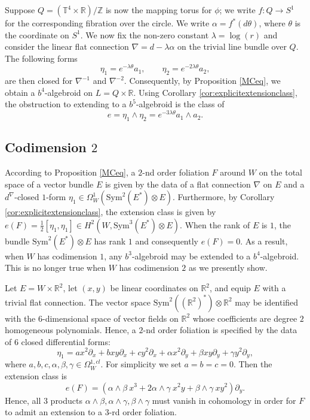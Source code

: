 \documentclass[10pt]{amsart}
\newcommand{\RR}{\mathbb{R}}
\newcommand{\TT}{\mathbb{T}}
\newcommand{\ZZ}{\mathbb{Z}}
\numberwithin{theoremalpha}{section}
\numberwithin{equation}{section}
\numberwithin{definition}{section}
\numberwithin{theorem}{section}
\numberwithin{proposition}{section}
\numberwithin{lemma}{section}
\numberwithin{example}{section}
\numberwithin{remark}{section}
\numberwithin{corollary}{section}
\numberwithin{question}{section}
\numberwithin{problem}{section}
\numberwithin{assumption}{section}
\theoremstyle{named}
\numberwithin{equation}{section}
\begin{document}
Suppose $Q = (\TT^4 \times \RR)/\ZZ$ is now the mapping torus for $\phi$; we write $f: Q \to S^1$ for the corresponding fibration over the circle. We write $\alpha = f^*(d\theta)$, where $\theta$ is the coordinate on $S^1$. We now fix the non-zero constant $\lambda = \log(r)$ and consider the linear flat connection $\nabla = d - \lambda \alpha$ on the trivial line bundle over $Q$. The following forms 
\[ \eta_{1} = e^{-\lambda \theta} a_{1}, \qquad \eta_{2} = e^{-2 \lambda \theta} a_{2}, \]
are then closed for $\nabla^{-1}$ and $\nabla^{-2}$. Consequently, by Proposition \ref{MCeq}, we obtain a $b^4$-algebroid on $L = Q \times \mathbb{R}$. Using Corollary \ref{cor:explicitextensionclass}, the obstruction to extending to a $b^{5}$-algebroid is the class of
\[ e = \eta_{1} \wedge \eta_{2} = e^{-3 \lambda \theta} a_{1} \wedge a_{2}. \]

\subsection{Codimension $2$}
According to Proposition \ref{MCeq}, a $2$-nd order foliation $F$ around $W$ on the total space of a vector bundle $E$ is given by the data of a flat connection $\nabla$ on $E$ and a $d^{\nabla}$-closed $1$-form $\eta_{1} \in \Omega^1_{W}(\mathrm{Sym}^2(E^*) \otimes E)$. Furthermore, by Corollary \ref{cor:explicitextensionclass}, the extension class is given by $e(F) = \frac{1}{2}[\eta_1, \eta_1] \in H^2(W, \mathrm{Sym}^3(E^*) \otimes E)$. When the rank of $E$ is $1$, the bundle $\mathrm{Sym}^2(E^*) \otimes E$ has rank $1$ and consequently $e(F) = 0$. As a result, when $W$ has codimension $1$, any $b^3$-algebroid may be extended to a $b^4$-algebroid. This is no longer true when $W$ has codimension $2$ as we presently show. 

Let $E = W \times \mathbb{R}^2$, let $(x,y)$ be linear coordinates on $\mathbb{R}^2$, and equip $E$ with a trivial flat connection. The vector space $\mathrm{Sym}^2((\mathbb{R}^2)^*) \otimes \mathbb{R}^2$ may be identified with the $6$-dimensional space of vector fields on $\mathbb{R}^2$ whose coefficients are degree $2$ homogeneous polynomials. Hence, a $2$-nd order foliation is specified by the data of $6$ closed differential forms: 
\[
\eta_{1} = a x^2 \partial_{x} + b xy \partial_{x} + c y^2 \partial_{x} + \alpha x^2 \partial_y + \beta xy \partial_y + \gamma y^2 \partial_y, 
\]
where $a, b, c, \alpha, \beta, \gamma \in \Omega_{W}^{1, cl}$. For simplicity we set $a = b = c = 0$. Then the extension class is 
\[
e(F) = (\alpha \wedge \beta \ x^3 + 2 \alpha \wedge \gamma \ x^2 y + \beta \wedge \gamma \ xy^2 ) \partial_y. 
\]
Hence, all $3$ products $\alpha \wedge \beta, \alpha \wedge \gamma, \beta \wedge \gamma$ must vanish in cohomology in order for $F$ to admit an extension to a $3$-rd order foliation. 
\end{document}
